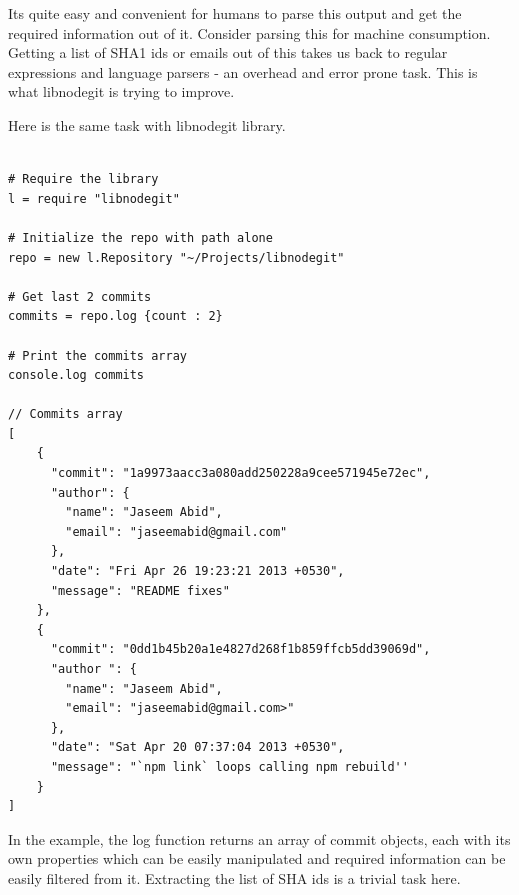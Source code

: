 Its quite easy and convenient for humans to parse this output and get the
required information out of it. Consider parsing this for machine consumption.
Getting a list of SHA1 ids or emails out of this takes us back to regular
expressions and language parsers - an overhead and error prone task. This is
what libnodegit is trying to improve.

Here is the same task with libnodegit library.

\begin{verbatim}

# Require the library
l = require "libnodegit"

# Initialize the repo with path alone
repo = new l.Repository "~/Projects/libnodegit"

# Get last 2 commits
commits = repo.log {count : 2}

# Print the commits array
console.log commits

// Commits array
[
    {
      "commit": "1a9973aacc3a080add250228a9cee571945e72ec",
      "author": {
        "name": "Jaseem Abid",
        "email": "jaseemabid@gmail.com"
      },
      "date": "Fri Apr 26 19:23:21 2013 +0530",
      "message": "README fixes"
    },
    {
      "commit": "0dd1b45b20a1e4827d268f1b859ffcb5dd39069d",
      "author ": {
        "name": "Jaseem Abid",
        "email": "jaseemabid@gmail.com>"
      },
      "date": "Sat Apr 20 07:37:04 2013 +0530",
      "message": "`npm link` loops calling npm rebuild''
    }
]

\end{verbatim}

In the example, the log function returns an array of commit objects, each with
its own properties which can be easily manipulated and required information can
be easily filtered from it. Extracting the list of SHA ids is a trivial task
here.
